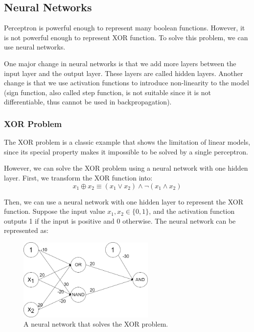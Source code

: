 \documentclass[a4paper,12pt]{article}
\begin{document}
\subsection{Neural Networks}

Perceptron is powerful enough to represent many boolean functions. However, it is not powerful enough to represent XOR function. To solve this problem, we can use neural networks.

One major change in neural networks is that we add more layers between the input layer and the output layer. These layers are called hidden layers. Another change is that we use activation functions to introduce non-linearity to the model (sign function, also called step function, is not suitable since it is not differentiable, thus cannot be used in backpropagation).

\subsubsection{XOR Problem}

The XOR problem is a classic example that shows the limitation of linear models, since its special property makes it impossible to be solved by a single perceptron.

However, we can solve the XOR problem using a neural network with one hidden layer. First, we transform the XOR function into:
\begin{equation*}
  x_1 \oplus x_2 \equiv (x_1 \lor x_2) \land \neg (x_1 \land x_2)
\end{equation*}

Then, we can use a neural network with one hidden layer to represent the XOR function. Suppose the input value $x_1, x_2 \in \{0, 1\}$, and the activation function outputs 1 if the input is positive and 0 otherwise. The neural network can be represented as:
\begin{figure}[H]
  \centering
  \includegraphics[width=0.6\textwidth]{figure/Xor NN.drawio.png}
  \caption{A neural network that solves the XOR problem.}
\end{figure}
\end{document}
